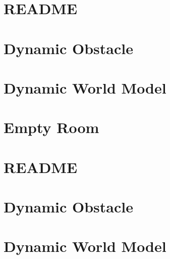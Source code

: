 \let\mypdfximage\pdfximage\def\pdfximage{\immediate\mypdfximage}\documentclass[twoside]{book}
\newcommand{\+}{\discretionary{\mbox{\scriptsize$\hookleftarrow$}}{}{}}
\begin{document}
\chapter{README}
\label{md_smacc2_sm_reference_library_sm_dance_bot_README}

\chapter{Dynamic Obstacle}
\label{md_smacc2_sm_reference_library_sm_dance_bot_lite_models_dynamic_obstacle_README}

\chapter{Dynamic World Model}
\label{md_smacc2_sm_reference_library_sm_dance_bot_lite_models_dynamic_world_README}

\chapter{Empty Room}
\label{md_smacc2_sm_reference_library_sm_dance_bot_lite_models_empty_room_README}

\chapter{README}
\label{md_smacc2_sm_reference_library_sm_dance_bot_lite_README}

\chapter{Dynamic Obstacle}
\label{md_smacc2_sm_reference_library_sm_dance_bot_strikes_back_models_dynamic_obstacle_README}

\chapter{Dynamic World Model}
\label{md_smacc2_sm_reference_library_sm_dance_bot_strikes_back_models_dynamic_world_README}

\end{document}
